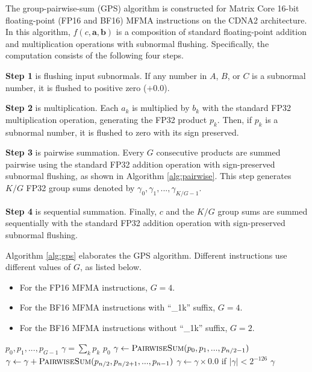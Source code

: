 The group-pairwise-sum (GPS) algorithm is constructed for Matrix Core 16-bit floating-point (FP16 and BF16) MFMA instructions on the CDNA2 architecture. In this algorithm, $f(c,\mathbf{a},\mathbf{b})$ is a composition of standard floating-point addition and multiplication operations with subnormal flushing. Specifically, the computation consists of the following four steps.

\textbf{Step 1} is flushing input subnormals. If any number in $A$, $B$, or $C$ is a subnormal number, it is flushed to positive zero ($+0.0$).

\textbf{Step 2} is multiplication. Each $a_k$ is multiplied by $b_k$ with the standard FP32 multiplication operation, generating the FP32 product $p_k$. Then, if $p_k$ is a subnormal number, it is flushed to zero with its sign preserved.

\textbf{Step 3} is pairwise summation. Every $G$ consecutive products are summed pairwise using the standard FP32 addition operation with sign-preserved subnormal flushing, as shown in Algorithm \ref{alg:pairwise}. This step generates $K/G$ FP32 group sums denoted by $\gamma_0, \gamma_1, ..., \gamma_{K/G-1}$.

\textbf{Step 4} is sequential summation. Finally, $c$ and the $K/G$ group sums are summed sequentially with the standard FP32 addition operation with sign-preserved subnormal flushing.

Algorithm \ref{alg:gps} elaborates the GPS algorithm. Different instructions use different values of $G$, as listed below.

\begin{itemize}
    \item For the FP16 MFMA instructions, $G=4$.
    \item For the BF16 MFMA instructions with ``\_1k'' suffix, $G=4$.
    \item For the BF16 MFMA instructions without ``\_1k'' suffix, $G=2$.
\end{itemize}

\begin{algorithm}
\small
\caption{Pairwise sum function.}
\label{alg:pairwise}
\begin{algorithmic}
\Require $p_0, p_1, ..., p_{G-1}$
\Ensure $\gamma = \sum_{k}p_k$
    \State \Return $p_0$
\Else
    \State $\gamma \gets \textsc{PairwiseSum}(p_0, p_1, ..., p_{n/2-1})$
    \State $\gamma \gets \gamma+ \textsc{PairwiseSum}(p_{n/2}, p_{n/2+1}, ..., p_{n-1})$
    \State $\gamma \gets \gamma \times 0.0$ if $|\gamma|<2^{-126}$ 
    \State \Return $\gamma$
\EndIf
\EndFunction
\end{algorithmic}
\end{algorithm}

